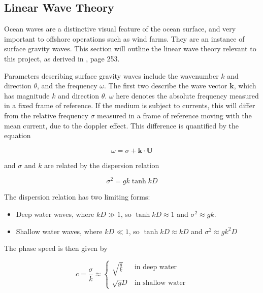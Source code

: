 \subsection{Linear Wave Theory}

Ocean waves are a distinctive visual feature of the ocean surface, and very important to offshore operations such as wind farms. They are an instance of surface gravity waves. This section will outline the linear wave theory relevant to this project, as derived in \cite{vallis_atmospheric_2017}, page 253.

Parameters describing surface gravity waves include the wavenumber $k$ and direction $\theta$, and the frequency $\omega$. The first two describe the wave vector $\mathbf{k}$, which has magnitude $k$ and direction $\theta$. $\omega$ here denotes the absolute frequency measured in a fixed frame of reference. If the medium is subject to currents, this will differ from the relative frequency $\sigma$ measured in a frame of reference moving with the mean current, due to the doppler effect. This difference is quantified by the equation

\begin{equation}
    \omega = \sigma + \mathbf{k} \cdot \mathbf{U}
    \label{eqn:doppler}
\end{equation}

and $\sigma$ and $k$ are related by the dispersion relation

\begin{equation}
    \sigma^2 = gk\tanh{kD}
    \label{eqn:disprel}
\end{equation}

The dispersion relation has two limiting forms:

\begin{itemize}
    \item Deep water waves, where $kD \gg 1$, so $\tanh{kD} \approx 1$ and $\sigma^2 \approx gk$.
    \item Shallow water waves, where $kD \ll 1$, so $\tanh{kD} \approx kD$ and $\sigma^2 \approx gk^2D$
\end{itemize}

The phase speed is then given by

\begin{equation}
c = \frac{\sigma}{k} \approx \begin{cases}
            \sqrt{\frac{g}{k}} & \text{in deep water} \\
            \sqrt{gD} & \text{in shallow water}
\end{cases}
\label{eqn:pspeed}
\end{equation}

